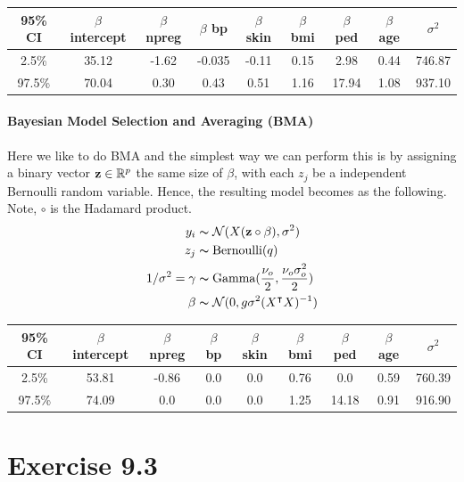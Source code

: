 \documentclass[11pt, letterpaper]{article}
\begin{document}
\begin{center}
\begin{tabular}{||c|c c c c c c c c||}
\hline
95\% CI & $\beta$ intercept & $\beta$ npreg & $\beta$ bp & $\beta$ skin & $\beta$ bmi & $\beta$ ped & $\beta$ age & $\sigma^2$ \\
\hline\hline
2.5\% & 35.12 & -1.62 &	-0.035 & -0.11 & 0.15 & 2.98 & 0.44 & 746.87 \\ 
97.5\% & 70.04 & 0.30 & 0.43 & 0.51 & 1.16 & 17.94 & 1.08 & 937.10 \\
\hline
\end{tabular}
\end{center}

\paragraph{Bayesian Model Selection and Averaging (BMA)}
Here we like to do BMA and the simplest way we can perform this is by assigning a binary vector $\bold{z} \in \mathbb{R}^p$ the same size of $\beta$, with each $z_j$ be a independent Bernoulli random variable. Hence, the resulting model becomes as the following. Note, $\circ$ is the Hadamard product.
\begin{align*}
    y_i &\thicksim \mathcal{N}(X(\bold{z} \circ \beta), \sigma^2) \\
    z_j &\thicksim \text{Bernoulli}(q) \\
    1/\sigma^2 = \gamma &\thicksim \text{Gamma}(\frac{\nu_o}{2}, \frac{\nu_o\sigma_o^2}{2}) \\
    \beta &\thicksim \mathcal{N}(0, g\sigma^2(X^{\intercal}X)^{-1})
\end{align*}

\begin{center}
\begin{tabular}{||c|c c c c c c c c||}
\hline
95\% CI & $\beta$ intercept & $\beta$ npreg & $\beta$ bp & $\beta$ skin & $\beta$ bmi & $\beta$ ped & $\beta$ age & $\sigma^2$ \\
\hline\hline
2.5\% & 53.81 & -0.86 & 0.0 & 0.0 & 0.76 & 0.0 & 0.59 & 760.39 \\ 
97.5\% & 74.09 & 0.0 & 0.0 & 0.0 & 1.25 & 14.18 & 0.91 & 916.90 \\
\hline
\end{tabular}
\end{center}




\section{Exercise 9.3}
\end{document}
